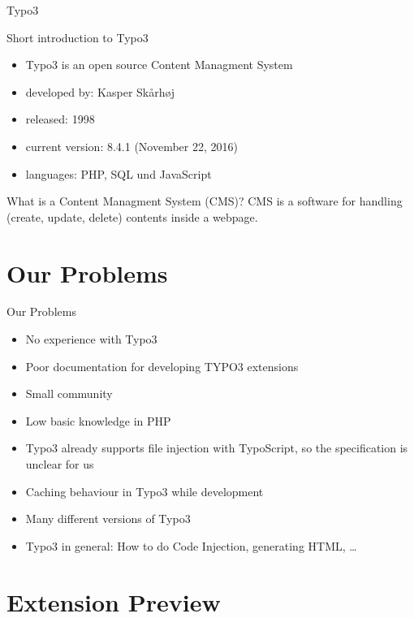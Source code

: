 \documentclass{beamer}
\begin{document}
\begin{frame}{Typo3}
\begin{block}{Short introduction to Typo3}
\begin{itemize}
\item Typo3 is an open source Content Managment System
\item developed by: Kasper Skårhøj
\item released: 1998
\item current version: 8.4.1 (November 22, 2016)
\item languages: PHP, SQL und JavaScript
\end{itemize}
\end{block}
\begin{block}{What is a Content Managment System (CMS)?}
CMS is a software for handling (create, update, delete) contents inside a webpage.
\end{block}

\end{frame}


\section{Our Problems}

\begin{frame}{Our Problems}
\begin{itemize}
\item No experience with Typo3
\item Poor documentation for developing TYPO3 extensions
\item Small community
\item Low basic knowledge in PHP
\item Typo3 already supports file injection with TypoScript, so the specification is unclear for us
\item Caching behaviour in Typo3 while development
\item Many different versions of Typo3
\item Typo3 in general: How to do Code Injection, generating HTML, \dots
\end{itemize}
\end{frame}


\section{Extension Preview}
\end{document}
